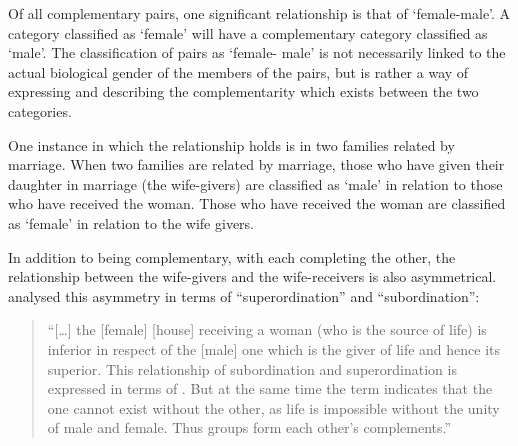Of all complementary pairs, one significant relationship
is that of  `female-male'.
A category classified as  `female'
will have a complementary category classified as  `male'.
The classification of pairs as  `female- male'
is not necessarily linked to the actual biological gender
of the members of the pairs,
but is rather a way of expressing and describing
the complementarity which exists between the two categories.

One instance in which the  relationship holds
is in two families related by marriage.
When two families are related by marriage, those who have given their daughter
in marriage (the wife-givers) are classified as  `male'
in relation to those who have received the woman.
Those who have received the woman are classified
as  `female' in relation to the wife givers.


In addition to being complementary, with each completing the other,
the relationship between the wife-givers and
the wife-receivers is also asymmetrical.
\cite{scno71} analysed this asymmetry in terms of
``superordination'' and ``subordination'':

\begin{quote}
``[\ldots] the [female]  [house] receiving a woman (who is the source of life)
is inferior in respect of the [male] one which is the giver of life and hence its superior.
This relationship of subordination and superordination is expressed in terms of .
But at the same time the term  indicates that the one cannot exist without the other,
as life is impossible without the unity of male and female.
Thus  groups form each other's complements.'' \hfill\citep[411]{scno71}
\end{quote}

